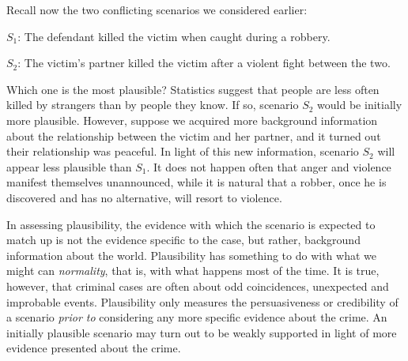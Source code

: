 \documentclass[10pt]{article}
\begin{document}
Recall now the two conflicting scenarios we considered earlier:
%
\begin{description}
	\item $S_1$: The defendant killed the victim when caught during a robbery.
	\item $S_2$: The victim's partner killed the victim after a violent fight between the two.
\end{description}
%
Which one is the most plausible?
Statistics suggest that people 
are less often killed by strangers than by people they know. 
If so, scenario $S_2$ would be initially more plausible. However, suppose we acquired more background information about 
the relationship between the victim and her partner, and it turned out their relationship was peaceful. In light of this new information, 
scenario $S_2$ will appear less plausible than $S_1$. It does not happen often that anger and violence manifest 
themselves unannounced, while it is natural that a robber, once he is discovered and has no alternative, will resort to violence. 

In assessing plausibility, the evidence with which the scenario is expected to match 
 up is not the evidence specific to the case, but rather, background information about the world. 
Plausibility has something to do with what we might can \textit{normality}, that is, with
what happens most of the time. %
 It is true, however, that criminal cases are often about odd coincidences, 
unexpected and improbable events. Plausibility only measures the persuasiveness or credibility 
of a scenario \textit{prior to} considering any more specific evidence about the crime. An initially plausible scenario may turn 
out to be weakly supported in light of more evidence presented about the crime. 

 


 
\end{document}

